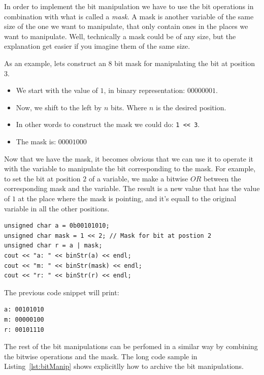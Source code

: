 In order to implement the bit manipulation we have to use the bit operations in combination with what is called a \emph{mask}.
A mask is another variable of the same size of the one we want to manipulate, that only contain ones in the places we want to manipulate.
Well, technically a mask could be of any size, but the explanation get easier if you imagine them of the same size.

As an example, lets construct an $8$ bit mask for manipulating the bit at position $3$.
\begin{itemize}
 \item We start with the value of $1$, in binary representation: $00000001$.
 \item Now, we shift to the left by $n$ bits. Where $n$ is the desired position.
 \item In other words to construct the mask we could do: \texttt{1 << 3}.
 \item The mask is: $00001000$
\end{itemize}

Now that we have the mask, it becomes obvious that we can use it to operate it with the variable to manipulate the bit corresponding to the mask.
For example, to set the bit at position $2$ of a variable, we make a bitwise $OR$ between the corresponding mask and the variable.
The result is a new value that has the value of $1$ at the place where the mask is pointing, and it's equall to the original variable in all the other positions.

\begin{verbatim}
unsigned char a = 0b00101010;
unsigned char mask = 1 << 2; // Mask for bit at postion 2
unsigned char r = a | mask;
cout << "a: " << binStr(a) << endl;
cout << "m: " << binStr(mask) << endl;
cout << "r: " << binStr(r) << endl;
\end{verbatim}
The previous code snippet will print:
\begin{verbatim}
a: 00101010
m: 00000100
r: 00101110
\end{verbatim}

The rest of the bit manipulations can be perfomed in a similar way by combining the bitwise operations and the mask.
The long code sample in Listing~\ref{lst:bitManip} shows explicitlly how to archive the bit manipulations.

{\centering
\begin{minipage}{\linewidth}
\end{minipage}
\par
}

